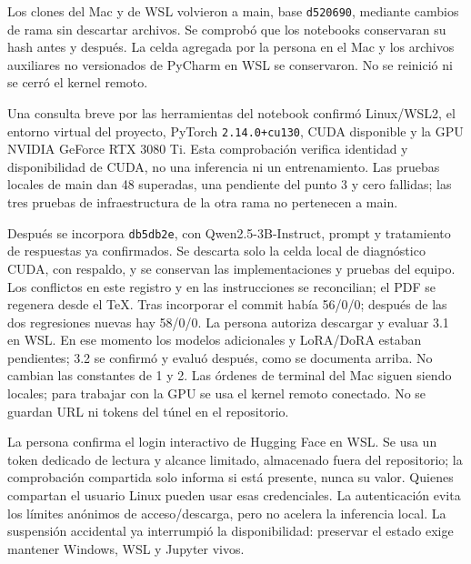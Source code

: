 \documentclass[11pt,letterpaper]{article}
\renewcommand{\_}{\originalunderscore\allowbreak}
\begin{document}
Los clones del Mac y de WSL volvieron a main, base \texttt{d520690}, mediante
cambios de rama sin descartar archivos. Se comprobó que los notebooks
conservaran su hash antes y después. La celda agregada por la persona en el
Mac y los archivos auxiliares no versionados de PyCharm en WSL se conservaron.
No se reinició ni se cerró el kernel remoto.

Una consulta breve por las herramientas del notebook confirmó Linux/WSL2,
el entorno virtual del proyecto, PyTorch \texttt{2.14.0+cu130}, CUDA disponible
y la GPU NVIDIA GeForce RTX 3080 Ti. Esta comprobación verifica identidad y
disponibilidad de CUDA, no una inferencia ni un entrenamiento. Las pruebas
locales de main dan 48 superadas, una pendiente del punto 3 y cero fallidas;
las tres pruebas de infraestructura de la otra rama no pertenecen a main.

Después se incorpora \texttt{db5db2e}, con Qwen2.5-3B-Instruct, prompt y
tratamiento de respuestas ya confirmados. Se descarta solo la celda local
de diagnóstico CUDA, con respaldo, y se conservan las implementaciones y
pruebas del equipo. Los conflictos en este registro y en las instrucciones
se reconcilian; el PDF se regenera desde el TeX. Tras incorporar el commit
había 56/0/0; después de las dos regresiones nuevas hay 58/0/0.
La persona autoriza descargar y evaluar 3.1 en WSL. En ese momento los modelos
adicionales y LoRA/DoRA estaban pendientes; 3.2 se confirmó y evaluó después,
como se documenta arriba. No cambian las constantes de 1 y 2.
Las órdenes de terminal del Mac siguen siendo locales; para trabajar con
la GPU se usa el kernel remoto conectado. No se guardan URL ni tokens del
túnel en el repositorio.

La persona confirma el login interactivo de Hugging Face en WSL. Se usa un
token dedicado de lectura y alcance limitado, almacenado fuera del repositorio;
la comprobación compartida solo informa si está presente, nunca su valor.
Quienes compartan el usuario Linux pueden usar esas credenciales. La
autenticación evita los límites anónimos de acceso/descarga, pero no acelera
la inferencia local. La suspensión accidental ya interrumpió la disponibilidad:
preservar el estado exige mantener Windows, WSL y Jupyter vivos.

\newpage
\end{document}
